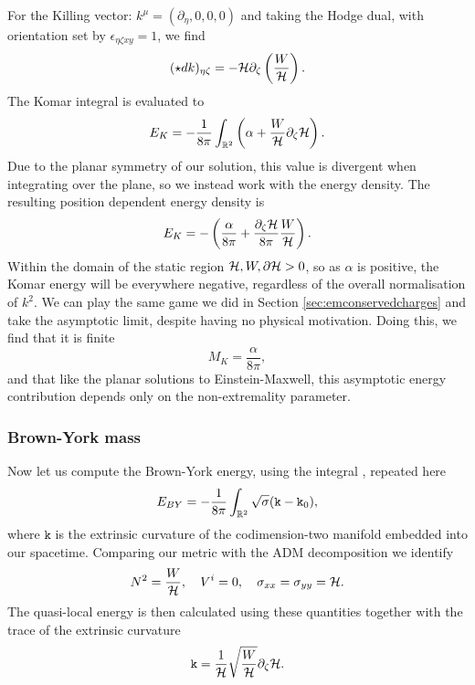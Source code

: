 For the Killing vector: $k^\mu = (\partial_\eta,0,0,0)$ and taking the Hodge dual, with orientation set by $\epsilon_{\eta \zeta x y} = 1$, we find
\begin{equation*}
    (\star dk)_{\eta \zeta} = -{\cal H} \partial_\zeta \left( \frac{W}{{\cal H}} \right) .
\end{equation*}
The Komar integral is evaluated to
\begin{equation*}
        E_K = -\frac{1}{8\pi} \int_{{\mathbb{R}}^2} \left(\alpha + \frac{W}{{\cal H}} \partial_{\zeta} {\cal H} \right) .
\end{equation*}
Due to the planar symmetry of our solution, this value is divergent when integrating over the plane, so we instead work with the energy density. The resulting position dependent energy density is
\begin{equation}
    E_K = - \left( \frac{\alpha}{8 \pi} + \frac{\partial_\zeta {\cal H}}{8 \pi} \frac{W}{{\cal H}} \right).
\end{equation}
Within the domain of the static region ${\cal H}, W, \partial {\cal H} > 0$, so as $\alpha$ is positive, the Komar energy will be everywhere negative, regardless of the overall normalisation of $k^2$. We can play the same game we did in Section \ref{sec:emconservedcharges} and take the asymptotic limit, despite having no physical motivation. Doing this, we find that it is finite
\begin{equation*}
	M_{K} = \frac{\alpha}{8 \pi},
\end{equation*} 
and that like the planar solutions to Einstein-Maxwell, this asymptotic energy contribution depends only on the non-extremality parameter. 

\subsubsection*{Brown-York mass}

Now let us compute the Brown-York energy, using the integral , repeated here
\begin{equation}
E_{BY} = -\frac{1}{8 \pi} \int_{{\mathbb{R}}^2} \sqrt{\sigma} (\mathtt{k} - \mathtt{k}_0),
\end{equation}
where $\mathtt{k}$ is the extrinsic curvature of the codimension-two manifold embedded into our spacetime. Comparing our metric  with the ADM decomposition  we identify
\begin{equation*}
N^2 = \frac{W}{{\cal H}}, \quad V^i = 0, \quad \sigma_{xx} = \sigma_{yy} = {\cal H}.
\end{equation*}
The quasi-local energy is then calculated using these quantities together with the trace of the extrinsic curvature
\begin{equation}
\mathtt{k} = \frac{1}{{\cal H}} \sqrt{\frac{W}{{\cal H}}}\partial_{\zeta} {\cal H}.
\end{equation}

